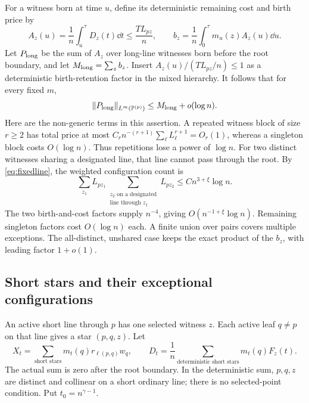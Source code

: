 For a witness born at time \(u\), define its deterministic remaining
cost and birth price by
\[
 A_z(u)=\frac1n\int_u^\tau D_z(t)\dd t\le\frac{TL_{pz}}n,
 \qquad b_z=\frac1n\int_0^\tau m_u(z)A_z(u)\dd u.
\]
Let \(P_{\rm long}\) be the sum of \(A_z\) over long-line witnesses
born before the root boundary, and let \(M_{\rm long}=\sum_z b_z\).
Insert \(A_z(u)/(TL_{pz}/n)\le1\) as a deterministic birth-retention
factor in the mixed hierarchy. It follows that for every fixed \(m\),
\begin{equation}\label{eq:longproxy}
 \|P_{\rm long}\|_{L^m(\mathbb P^{(p)})}
 \le M_{\rm long}+o(\log n).
\end{equation}
Here are the non-generic terms in this assertion. A repeated witness
block of size \(r\ge2\) has total price at most
\(C_r n^{-(r+1)}\sum_\ell L_\ell^{r+1}=O_r(1)\), whereas a
singleton block costs \(O(\log n)\). Thus repetitions lose a power
of \(\log n\). For two distinct witnesses sharing a designated
line, that line cannot pass through the root. By
\eqref{eq:fixedline}, the weighted configuration count is
\[
 \sum_{z_1}L_{pz_1}
 \sum_{\substack{z_2\text{ on a designated}\\\text{line through }z_1}}L_{pz_2}
 \le C n^{3+\xi}\log n.
\]
The two birth-and-cost factors supply \(n^{-4}\), giving
\(O(n^{-1+\xi}\log n)\). Remaining singleton factors cost
\(O(\log n)\) each. A finite union over pairs covers multiple
exceptions. The all-distinct, unshared case keeps the exact product
of the \(b_z\), with leading factor \(1+o(1)\).

\subsection{Short stars and their exceptional configurations}
An active short line through \(p\) has one selected witness \(z\).
Each active leaf \(q\ne p\) on that line gives a star \((p,q,z)\).
Let
\[
 X_t=\sum_{\text{short stars}}m_t(q)r_{\ell(p,q)}w_q,
 \qquad
 D_t=\frac1n\sum_{\text{deterministic short stars}}m_t(q)F_z(t).
\]
The actual sum is zero after the root boundary. In the deterministic
sum, \(p,q,z\) are distinct and collinear on a short ordinary line;
there is no selected-point condition.
Put \(t_0=n^{\gamma-1}\).

